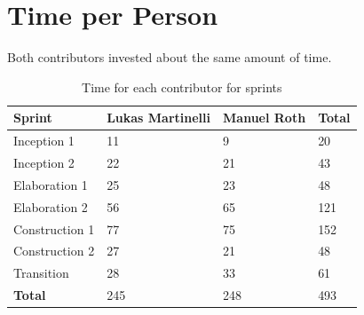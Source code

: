 \section{Time per Person}

Both contributors invested about the same amount of time.

\begin{table}[H]
    \begin{tabular}{llll}
    \textbf{Sprint}  & \textbf{Lukas Martinelli} & \textbf{Manuel Roth} & \textbf{Total} \\
    \hline
    Inception 1    & 11               & 9           & 20    \\
    Inception 2    & 22               & 21          & 43    \\
    Elaboration 1  & 25               & 23          & 48    \\
    Elaboration 2  & 56               & 65          & 121   \\
    Construction 1 & 77               & 75          & 152   \\
    Construction 2 & 27               & 21          & 48    \\
    Transition     & 28               & 33          & 61    \\
    \hline
    \textbf{Total}          & 245              & 248         & 493   \\
    \end{tabular}
    \caption{Time for each contributor for sprints}
\end{table}